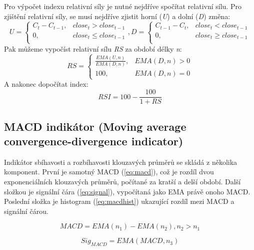 Pro výpočet indexu relativní síly je nutné nejdříve spočítat relativní sílu. Pro zjištění relativní síly, se musí nejdříve zjistit horní (\emph{U}) a dolní (\emph{D}) změna:
\begin{equation}
    U = \begin{cases}
        C_t - C_{t - 1}, & close_t > close_{t - 1}   \\
        0,               & close_t \le close_{t - 1} \\
    \end{cases}
    ,
    D = \begin{cases}
        C_{t - 1} - C_t, & close_t < close_{t - 1}   \\
        0,               & close_t \ge close_{t - 1} \\
    \end{cases}
    \label{eq:du}
\end{equation}
Pak můžeme vypočíst relativní sílu \emph{RS} za období délky \emph{n}:
\begin{equation}
    RS =
    \begin{cases}
        \frac{EMA(U, n)}{EMA(D, n)}, & {EMA(D, n)} > 0 \\
        100,                         & {EMA(D, n)} = 0
    \end{cases}
    \label{eq:rs}
\end{equation}
A nakonec dopočítat index:
\begin{equation}
    RSI = 100 - \frac{100}{1 + RS}
    \label{eq:rsi}
\end{equation}

\subsection{MACD indikátor (Moving average convergence-divergence indicator)}
Indikátor sbíhavosti a rozbíhavosti klouzavých průměrů se skládá z několika komponent. První je samotný MACD (\ref{eq:macd}), což je rozdíl dvou exponenciálních klouzavých průměrů, počítané
za kratší a delší období. Další složkou je signální čára (\ref{eq:signal}), vypočítaná jako EMA právě onoho MACD. Poslední složka je histogram (\ref{eq:macdhist})
ukazující rozdíl mezi MACD a signální čárou.

\begin{equation}
    MACD = EMA(n_1) - EMA(n_2), n_2 > n_1
    \label{eq:macd}
\end{equation}

\begin{equation}
    Sig_{MACD} = EMA(MACD, n_3)
    \label{eq:signal}
\end{equation}

